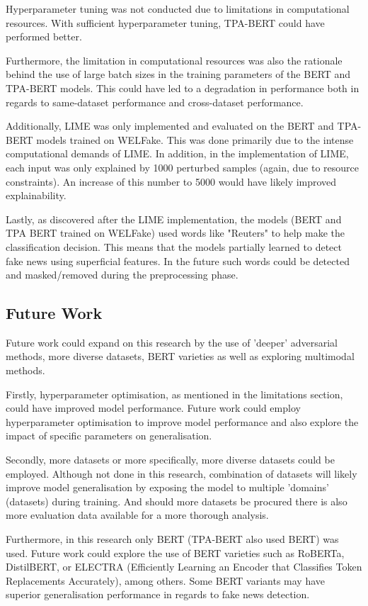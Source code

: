 \documentclass[stu,12pt,floatsintext,donotrepeattitle]{apa7}
\begin{document}
Hyperparameter tuning was not conducted due to limitations in computational resources. With sufficient hyperparameter tuning, TPA-BERT could have performed better. 

Furthermore, the limitation in computational resources was also the rationale behind the use of large batch sizes in the training parameters of the BERT and TPA-BERT models. This could have led to a degradation in performance both in regards to same-dataset performance and cross-dataset performance. 

Additionally, LIME was only implemented and evaluated on the BERT and TPA-BERT models trained on WELFake. This was done primarily due to the intense computational demands of LIME. In addition, in the implementation of LIME, each input was only explained by 1000 perturbed samples (again, due to resource constraints). An increase of this number to 5000 would have likely improved explainability.

Lastly, as discovered after the LIME implementation, the models (BERT and TPA BERT trained on WELFake) used words like "Reuters" to help make the classification decision. This means that the models partially learned to detect fake news using superficial features. In the future such words could be detected and masked/removed during the preprocessing phase.

\subsection{Future Work}
Future work could expand on this research by the use of 'deeper' adversarial methods, more diverse datasets, BERT varieties as well as exploring multimodal methods.

Firstly, hyperparameter optimisation, as mentioned in the limitations section, could have improved model performance. Future work could employ hyperparameter optimisation to improve model performance and also explore the impact of specific parameters on generalisation. 

Secondly, more datasets or more specifically, more diverse datasets could be employed. Although not done in this research, combination of datasets will likely improve model generalisation by exposing the model to multiple 'domains' (datasets) during training. And should more datasets be procured there is also more evaluation data available for a more thorough analysis. 

Furthermore, in this research only BERT (TPA-BERT also used BERT) was used. Future work could explore the use of BERT varieties such as RoBERTa, DistilBERT, or ELECTRA (Efficiently Learning an Encoder that Classifies Token Replacements Accurately), among others. Some BERT variants may have superior generalisation performance in regards to fake news detection.
\end{document}
